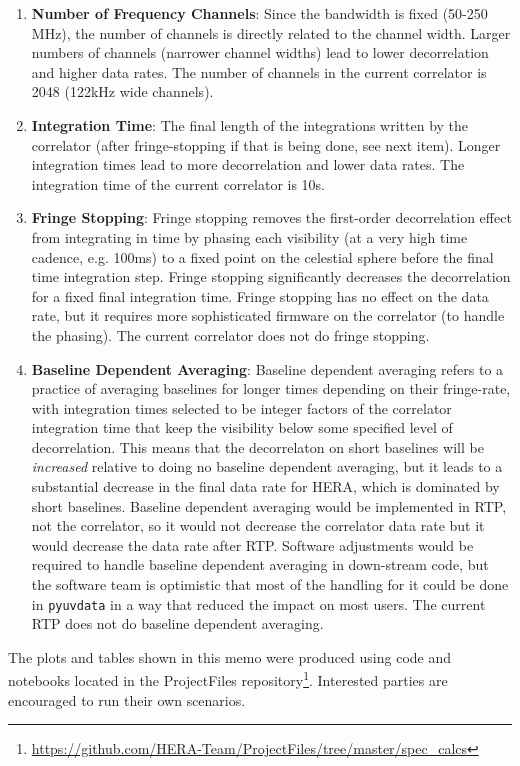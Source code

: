 \documentclass{article}
\begin{document}
\begin{enumerate}
\item \textbf{Number of Frequency Channels}: Since the bandwidth is fixed (50-250 MHz), the number of channels is directly related to the channel 
width. Larger numbers of channels (narrower channel widths) lead to lower decorrelation and higher data rates.
The number of channels in the current correlator is 2048 (122kHz wide channels).
\item \textbf{Integration Time}: The final length of the integrations written by the correlator (after fringe-stopping if that is being done, see next item). 
Longer integration times lead to more decorrelation and lower data rates. The integration time of the current correlator is 10s.
\item \textbf{Fringe Stopping}: Fringe stopping removes the first-order decorrelation effect from integrating in time by phasing each visibility (at a very 
high time cadence, e.g. 100ms) to a fixed point on the celestial sphere before the final time integration step. Fringe stopping significantly decreases 
the decorrelation for a fixed final integration time. Fringe stopping has no effect on the data rate, but it requires more sophisticated firmware on the 
correlator (to handle the phasing). The current correlator does not do fringe stopping.
\item \textbf{Baseline Dependent Averaging}: Baseline dependent averaging refers to a practice of averaging baselines for longer times depending on 
their fringe-rate, with integration times selected to be integer factors of the correlator integration time that keep the visibility below some specified 
level of decorrelation. This means that the decorrelaton on short baselines will be \textit{increased} relative to doing no baseline dependent 
averaging, but it leads to a substantial decrease in the final data rate for HERA, which is dominated by short baselines. Baseline dependent 
averaging would be implemented in RTP, not the correlator, so it would not decrease the correlator data rate but it would decrease the data rate after 
RTP. Software adjustments would be required to handle baseline dependent averaging in down-stream code, but the software team is optimistic that 
most of the handling for it could be done in \texttt{pyuvdata} in a way that reduced the impact on most users. The current RTP does not do baseline 
dependent averaging.
\end{enumerate}

The plots and tables shown in this memo were produced using code and notebooks located in the 
ProjectFiles repository\footnote{\label{code_link} \url{https://github.com/HERA-Team/ProjectFiles/tree/master/spec_calcs}}. 
Interested parties are encouraged to run their own scenarios.
\end{document}
